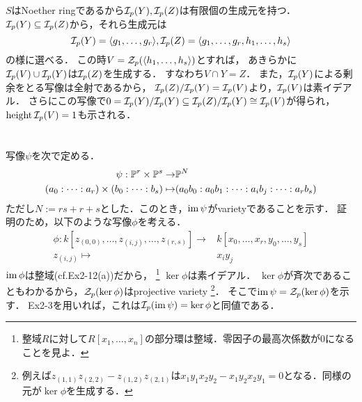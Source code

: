 \documentclass[a4paper]{jsarticle}
\begin{document}
    $S$はNoether ringであるから$\mathcal{I}_p(Y), \mathcal{I}_p(Z)$は有限個の生成元を持つ．
    $\mathcal{I}_p(Y) \subseteq \mathcal{I}_p(Z)$から，それら生成元は
    \[ \mathcal{I}_p(Y)=\langle g_1,\dots,g_r \rangle, \mathcal{I}_p(Z)=\langle g_1,\dots,g_r, h_1,\dots,h_s \rangle \]
    の様に選べる．
    この時$V=\mathcal{Z}_p(\langle h_1,\dots,h_s \rangle)$とすれば，
    あきらかに$\mathcal{I}_p(V) \cup \mathcal{I}_p(Y)$は$\mathcal{I}_p(Z)$を生成する．
    すなわち$V \cap Y=Z$．
    また，$\mathcal{I}_p(Y)$による剰余をとる写像は全射であるから，
    $\mathcal{I}_p(Z)/\mathcal{I}_p(Y)=\mathcal{I}_p(V)$より，$\mathcal{I}_p(V)$は素イデアル．
    さらにこの写像で$0=\mathcal{I}_p(Y)/\mathcal{I}_p(Y) \subseteq \mathcal{I}_p(Z)/\mathcal{I}_p(Y) \cong \mathcal{I}_p(V)$が得られ，
    $\operatorname{height} \mathcal{I}_p(V)=1$も示される．

\section{ } %
    写像$\psi$を次で定める．
    \begin{align*}
        \psi: \mathbb{P}^r \times \mathbb{P}^s \to& \mathbb{P}^N \\
        (a_0: \dots: a_r) \times (b_0: \dots: b_s) \mapsto& (a_0 b_0: a_0 b_1: \dots: a_i b_j: \dots: a_r b_s)
    \end{align*}
    ただし$N:=rs+r+s$とした．このとき，$\operatorname{im} \psi$がvarietyであることを示す．
    証明のため，以下のような写像$\phi$を考える．
    \begin{align*}
        \phi: k[z_{(0,0)}, \dots, z_{(i,j)}, \dots, z_{(r,s)}] \to& k[x_0, \dots, x_r, y_0, \dots, y_s] \\
        z_{(i,j)} \mapsto& x_i y_j
    \end{align*}
    $\operatorname{im} \phi$は整域(cf.Ex2-12(a))だから，
    \footnote{整域$R$に対して$R[x_1,\dots,x_n]$の部分環は整域．零因子の最高次係数が0になることを見よ．}
    $\ker \phi$は素イデアル．
    $\ker \phi$が斉次であることもわかるから，$\mathcal{Z}_p(\ker \phi)$はprojective variety
    \footnote{例えば$z_{(1,1)}z_{(2,2)}-z_{(1,2)}z_{(2,1)}$は$x_1y_1x_2y_2-x_1y_2x_2y_1=0$となる．同様の元が$\ker \phi$を生成する．}．
    そこで$\operatorname{im} \psi = \mathcal{Z}_p(\ker \phi)$を示す．
    Ex2-3を用いれば，これは$\mathcal{I}_p(\operatorname{im} \psi) = \ker \phi$と同値である．
\end{document}
